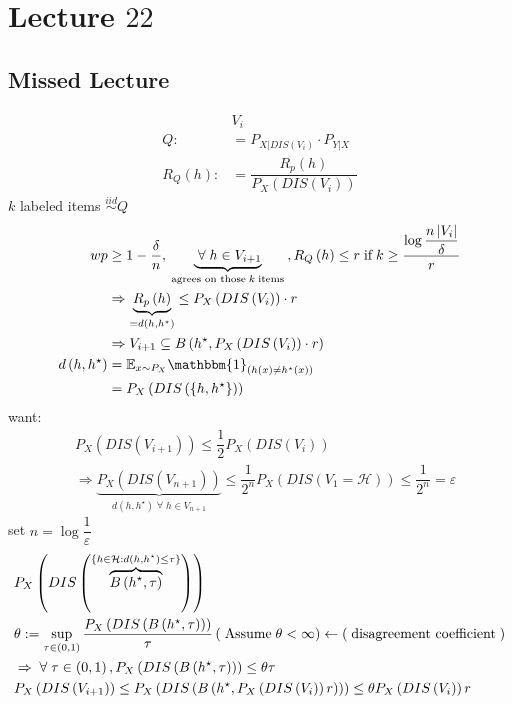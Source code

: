 \documentclass{article}
\begin{document}
\section{Lecture $22$} 

\subsection{Missed Lecture}
\begin{align*}
&V_{i}
\\ Q  :&= P_{X | DIS\left(V_{i}\right) } \cdot  P_{Y | X}
\\ R_{Q}\left(h\right) :&= \dfrac{R_{p}\left(h\right)}{P_{X}\left(DIS\left(V_{i}\right) \right)}
\end{align*}
$k $ labeled items $\stackrel{iid}{\sim} Q $
\begin{align*}
wp  &\geq  1 - \dfrac{\delta}{n}, \underbrace{\;\forall\; h \in V_{i+1}}_{\text{\;agrees on those\;} k \text{\;items\;}}, R_{Q}\left(h\right) \leq  r \text{\;if\;} k \geq  \dfrac{\log \dfrac{n \left|  V_{i}  \right|}{\delta}}{r}
\\ &\Rightarrow  \underbrace{R_{p}\left(h\right)}_{= d\left(h, h^\star \right)} \leq  P_{X}\left(DIS\left(V_{i}\right) \right) \cdot  r
\\ &\Rightarrow  V_{i+1} \subseteq B\left(h^\star , P_{X}\left(DIS\left(V_{i}\right) \right) \cdot  r\right)
\\ d\left(h, h^\star \right)  &= \mathbb{E}_{x \sim  P_{X}} \mathbbm{1}_{\left(h\left(x\right) \neq  h^\star \left(x\right)\right)}
\\ &= P_{X}\left(DIS\left(\left\{h, h^\star \right\}\right) \right)
\end{align*}
want:
\begin{align*}
&  P_{X}\left(DIS\left(V_{i+1}\right) \right) \leq  \dfrac{1}{2} P_{X}\left(DIS\left(V_{i}\right) \right)
\\ &\Rightarrow  \underbrace{P_{X}\left(DIS\left(V_{n+1}\right) \right)}_{d\left(h, h^\star \right) \;\forall\; h \in V_{n+1}} \leq  \dfrac{1}{2^{n}} P_{X}\left(DIS\left(V_{1} = \mathcal{H}\right) \right) \leq  \dfrac{1}{2^{n}} = \varepsilon
\end{align*}
set $n  = \log \dfrac{1}{\varepsilon}$
\begin{align*}
&  P_{X}\left(DIS\left(\overbrace{B\left(h^\star , \tau\right)}^{\left\{h \in \mathcal{H} : d\left(h, h^\star \right) \leq  \tau\right\}}\right) \right)
\\ &  \theta := \displaystyle\sup_{\tau \in \left(0, 1\right)} \dfrac{P_{X}\left(DIS\left(B\left(h^\star , \tau\right)\right) \right)}{\tau} \left(\text{\;Assume\;} \theta < \infty\right) \leftarrow \left(\text{\;disagreement coefficient\;}\right)
\\ &\Rightarrow  \;\forall\; \tau \in \left(0, 1\right), P_{X}\left(DIS\left(B\left(h^\star , \tau\right)\right) \right) \leq  \theta \tau
\\ &  P_{X}\left(DIS\left(V_{i+1}\right) \right) \leq  P_{X}\left(DIS\left(B\left(h^\star , P_{X}\left(DIS\left(V_{i}\right) \right) r\right)\right) \right) \leq  \theta P_{X}\left(DIS\left(V_{i}\right) \right) r 
\end{align*}
\end{document}
